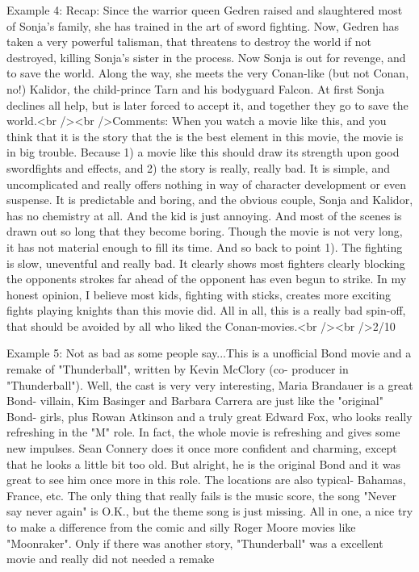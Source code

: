 \begin{simplechar}
Example 4:
Recap: Since the warrior queen Gedren raised and slaughtered most of Sonja's family, she has trained in the art of sword fighting. Now, Gedren has taken a very powerful talisman, that threatens to destroy the world if not destroyed, killing Sonja's sister in the process. Now Sonja is out for revenge, and to save the world. Along the way, she meets the very Conan-like (but not Conan, no!) Kalidor, the child-prince Tarn and his bodyguard Falcon. At first Sonja declines all help, but is later forced to accept it, and together they go to save the world.<br /><br />Comments: When you watch a movie like this, and you think that it is the story that the is the best element in this movie, the movie is in big trouble. Because 1) a movie like this should draw its strength upon good swordfights and effects, and 2) the story is really, really bad. It is simple, and uncomplicated and really offers nothing in way of character development or even suspense. It is predictable and boring, and the obvious couple, Sonja and Kalidor, has no chemistry at all. And the kid is just annoying. And most of the scenes is drawn out so long that they become boring. Though the movie is not very long, it has not material enough to fill its time. And so back to point 1). The fighting is slow, uneventful and really bad. It clearly shows most fighters clearly blocking the opponents strokes far ahead of the opponent has even begun to strike. In my honest opinion, I believe most kids, fighting with sticks, creates more exciting fights playing knights than this movie did. All in all, this is a really bad spin-off, that should be avoided by all who liked the Conan-movies.<br /><br />2/10

Example 5:
Not as bad as some people say...This is a unofficial Bond movie and a remake of "Thunderball", written by Kevin McClory (co- producer in "Thunderball"). Well, the cast is very very interesting, Maria Brandauer is a great Bond- villain, Kim Basinger and Barbara Carrera are just like the "original" Bond- girls, plus Rowan Atkinson and a truly great Edward Fox, who looks really refreshing in the "M" role. In fact, the whole movie is refreshing and gives some new impulses. Sean Connery does it once more confident and charming, except that he looks a little bit too old. But alright, he is the original Bond and it was great to see him once more in this role. The locations are also typical- Bahamas, France, etc. The only thing that really fails is the music score, the song "Never say never again" is O.K., but the theme song is just missing. All in one, a nice try to make a difference from the comic and silly Roger Moore movies like "Moonraker". Only if there was another story, "Thunderball" was a excellent movie and really did not needed a remake
\end{simplechar}